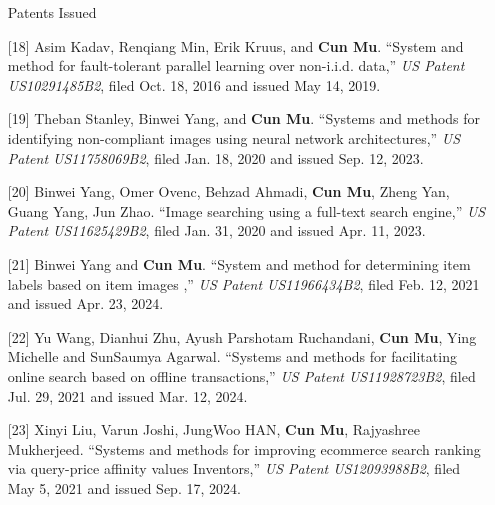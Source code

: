 \documentclass[11pt,a4paper,roman]{moderncv} %
\begin{document}
\begin{enumerate}
\vspace*{3mm}
{\color{color1} Patents Issued}
\vspace*{1mm}
\item[{[18]}] Asim Kadav, Renqiang Min, Erik Kruus, and {\bfseries Cun Mu}. ``System and method for fault-tolerant parallel learning over non-i.i.d. data,'' 
{\em US Patent US10291485B2}, filed Oct. 18, 2016 and issued May 14, 2019.
\item[{[19]}] Theban Stanley, Binwei Yang, and {\bfseries Cun Mu}. ``Systems and methods for identifying non-compliant images using neural network architectures,'' 
{\em US Patent US11758069B2}, filed Jan. 18, 2020 and issued Sep. 12, 2023.
\item[{[20]}] Binwei Yang, Omer Ovenc, Behzad Ahmadi, {\bfseries Cun Mu}, Zheng Yan, Guang Yang, Jun Zhao. ``Image searching using a full-text search engine,'' 
{\em US Patent US11625429B2}, filed Jan. 31, 2020 and issued Apr. 11, 2023.
\item[{[21]}] Binwei Yang and {\bfseries Cun Mu}. 
``System and method for determining item labels based on item images
,'' 
{\em US Patent US11966434B2}, filed Feb. 12, 2021 and issued Apr. 23, 2024.
\item[{[22]}] Yu Wang, Dianhui Zhu, Ayush Parshotam Ruchandani, {\bfseries Cun Mu}, Ying Michelle and SunSaumya Agarwal. ``Systems and methods for facilitating online search based on offline transactions,'' 
{\em US Patent US11928723B2}, filed Jul. 29, 2021 and issued Mar. 12, 2024.
\item[{[23]}] Xinyi Liu, Varun Joshi, JungWoo HAN, {\bfseries Cun Mu}, Rajyashree Mukherjeed. 
``Systems and methods for improving ecommerce search ranking via query-price affinity values Inventors,'' 
{\em US Patent US12093988B2}, filed May 5, 2021 and issued Sep. 17, 2024.
\end{enumerate}
\end{document}
